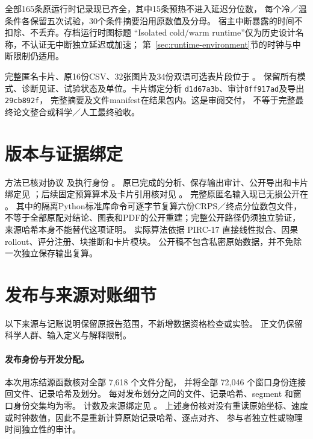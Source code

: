 全部165条原运行时记录现已齐全，其中15条预热不进入延迟分位数，
每个冷／温条件各保留五次试验，30个条件摘要沿用原数值及分母。
宿主中断暴露的时间不扣除、不丢弃。存档运行时图标题
“Isolated cold/warm runtime”仅为历史设计名称，不认证无中断独立延迟或加速；
第~\ref{sec:runtime-environment}节的时钟与中断限制仍适用。

完整匿名卡片、原16份CSV、32张图片及34份双语可选表片段位于
。
保留所有模式、诊断见证、试验状态及单位。卡片绑定分析
\texttt{d1d67a3b}、审计\texttt{8ff917ad}及导出\texttt{29cb892f}，
完整摘要及文件manifest在结果包内。这是审阅交付，
不等于完整最终论文整合或科学／人工最终验收。
\FloatBarrier



\section{版本与证据绑定}
方法已核对协议
及执行身份
。
原已完成的分析、保存输出审计、公开导出和卡片绑定见
；后续固定预算算术及卡片引用核对见
。
完整原匿名输入现已无损公开在 。
其中的隔离Python标准库命令可逐字节复算六份CRPS／终点分位数包文件，
不等于全部原配对结论、图表和PDF的公开重建；完整公开路径仍须独立验证，
来源哈希本身不能替代这项证明。
实际算法依据 PIRC-17 直接线性拟合、因果 rollout、评分注册、块推断和卡片模块。
公开稿不包含私密原始数据，并不免除一次独立保存输出复算。


\section{发布与来源对账细节}
\label{sec:source-reconciliation-details}\hypertarget{sec:source-reconciliation-details}{}
以下来源与记账说明保留原报告范围，不新增数据资格检查或实验。
正文仍保留科学人群、输入定义与解释限制。

\paragraph{发布身份与开发分配。}
本次用冻结源函数核对全部 7,618 个文件分配，
并将全部 72,046 个窗口身份连接回文件、记录哈希及划分。
每对发布划分之间的文件、记录哈希、segment 和窗口身份交集均为零。
计数及来源绑定见 。
上述身份核对没有重读原始坐标、速度或时钟数值，因此不是重新计算原始记录哈希、逐点对齐、
参与者独立性或物理时间独立性的审计。

